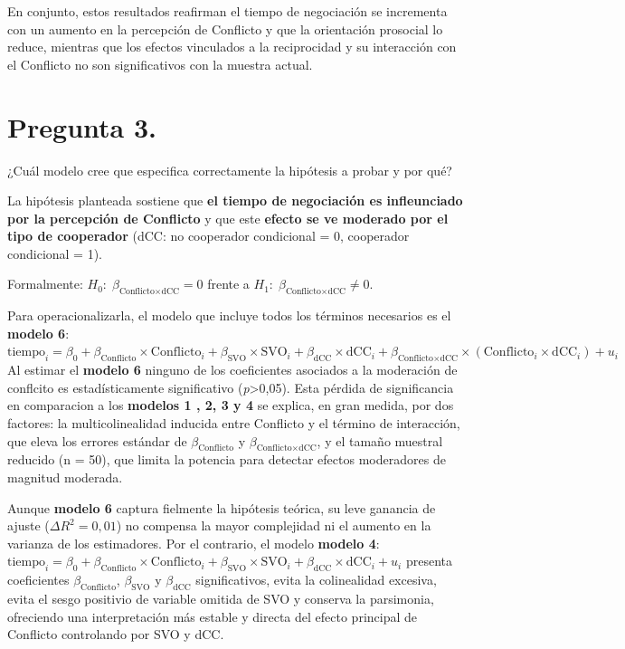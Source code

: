 \documentclass[
  spanish,
  10pt,
]{article}
\begin{document}
En conjunto, estos resultados reafirman el tiempo de negociación se
incrementa con un aumento en la percepción de Conflicto y que la
orientación prosocial lo reduce, mientras que los efectos vinculados a
la reciprocidad y su interacción con el Conflicto no son significativos
con la muestra actual.

\section{Pregunta 3.}\label{pregunta-3.}

¿Cuál modelo cree que especifica correctamente la hipótesis a probar y
por qué?

La hipótesis planteada sostiene que \textbf{el tiempo de negociación es
infleunciado por la percepción de Conflicto} y que este \textbf{efecto
se ve moderado por el tipo de cooperador} (dCC: no cooperador
condicional = 0, cooperador condicional = 1).

Formalmente: \(H_0:\;\beta_{\text{Conflicto}\times\text{dCC}} = 0\)
frente a \(H_1:\;\beta_{\text{Conflicto}\times\text{dCC}} \neq 0\).

Para operacionalizarla, el modelo que incluye todos los términos
necesarios es el \textbf{modelo 6}:
\(\text{tiempo}_i = \beta_0 + \beta_{\text{Conflicto}}\times\text{Conflicto}_i + \beta_{\text{SVO}}\times\text{SVO}_i + \beta_{\text{dCC}}\times\text{dCC}_i + \beta_{\text{Conflicto}\times\text{dCC}}\times(\text{Conflicto}_i\times\text{dCC}_i) + u_i\)
Al estimar el \textbf{modelo 6} ninguno de los coeficientes asociados a
la moderación de conflcito es estadísticamente significativo
(\emph{p}\textgreater0,05). Esta pérdida de significancia en comparacion
a los \textbf{modelos 1 , 2, 3 y 4} se explica, en gran medida, por dos
factores: la multicolinealidad inducida entre Conflicto y el término de
interacción, que eleva los errores estándar de
\(\beta_{\text{Conflicto}}\) y
\(\beta_{\text{Conflicto}\times\text{dCC}}\), y el tamaño muestral
reducido (n = 50), que limita la potencia para detectar efectos
moderadores de magnitud moderada.

Aunque \textbf{modelo 6} captura fielmente la hipótesis teórica, su leve
ganancia de ajuste (\(\Delta R^2 = 0,01\)) no compensa la mayor
complejidad ni el aumento en la varianza de los estimadores. Por el
contrario, el modelo \textbf{modelo 4}:
\(\text{tiempo}_i = \beta_0 + \beta_{\text{Conflicto}}\times\text{Conflicto}_i+ \beta_{\text{SVO}}\times\text{SVO}_i+ \beta_{\text{dCC}}\times\text{dCC}_i+ u_i\)
presenta coeficientes \(\beta_{\text{Conflicto}}\),
\(\beta_{\text{SVO}}\) y \(\beta_{\text{dCC}}\) significativos, evita la
colinealidad excesiva, evita el sesgo positivio de variable omitida de
SVO y conserva la parsimonia, ofreciendo una interpretación más estable
y directa del efecto principal de Conflicto controlando por SVO y dCC.
\end{document}
